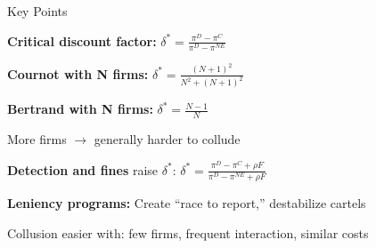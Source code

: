 \documentclass[notes,11pt, aspectratio=169]{beamer}
\newenvironment{wideenumerate}{\enumerate\addtolength{\itemsep}{10pt}}{\endenumerate}
\begin{document}

\begin{frame}{Key Points}
	\vspace{11pt}
	\begin{wideenumerate}
		\item \textbf{Critical discount factor:} $\delta^* = \frac{\pi^D - \pi^C}{\pi^D - \pi^{NE}}$
		\item \textbf{Cournot with N firms:} $\delta^* = \frac{(N+1)^2}{N^2 + (N+1)^2}$
		\item \textbf{Bertrand with N firms:} $\delta^* = \frac{N-1}{N}$
		\item More firms $\rightarrow$ generally harder to collude
		\item \textbf{Detection and fines} raise $\delta^*$: $\delta^* = \frac{\pi^D - \pi^C + \rho F}{\pi^D - \pi^{NE} + \rho F}$
		\item \textbf{Leniency programs:} Create ``race to report,'' destabilize cartels
		\item Collusion easier with: few firms, frequent interaction, similar costs
	\end{wideenumerate}
\end{frame}
\end{document}
